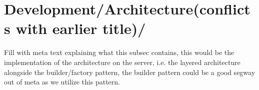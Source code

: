 \section{Development/Architecture(conflicts with earlier title)/}
Fill with meta text explaining what this subsec contains, this would be the implementation of the architecture on the server, i.e. the layered architecture alongside the builder/factory pattern, the builder pattern could be a good segway out of meta as we utilize this pattern.
